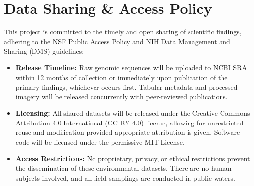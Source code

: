 \section{Data Sharing \& Access Policy}
This project is committed to the timely and open sharing of scientific findings, adhering to the NSF Public Access Policy and NIH Data Management and Sharing (DMS) guidelines:
\begin{itemize}
    \item \textbf{Release Timeline:} Raw genomic sequences will be uploaded to NCBI SRA within 12 months of collection or immediately upon publication of the primary findings, whichever occurs first. Tabular metadata and processed imagery will be released concurrently with peer-reviewed publications.
    \item \textbf{Licensing:} All shared datasets will be released under the Creative Commons Attribution 4.0 International (CC BY 4.0) license, allowing for unrestricted reuse and modification provided appropriate attribution is given. Software code will be licensed under the permissive MIT License.
    \item \textbf{Access Restrictions:} No proprietary, privacy, or ethical restrictions prevent the dissemination of these environmental datasets. There are no human subjects involved, and all field samplings are conducted in public waters.
\end{itemize}
